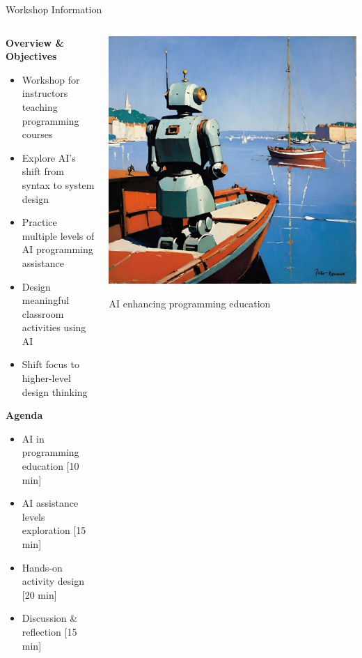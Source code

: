 \documentclass[xcolor={dvipsnames,table}, aspectratio=169]{beamer}
\begin{document}
\begin{frame}{Workshop Information}
  \begin{columns}
    \begin{column}{0.58\textwidth}
      \textbf{Overview \& Objectives}
      \begin{itemize}\small
        \item Workshop for instructors teaching programming courses
        \item Explore AI's shift from syntax to system design
        \item Practice multiple levels of AI programming assistance
        \item Design meaningful classroom activities using AI
        \item Shift focus to higher-level design thinking
      \end{itemize}
      
      \textbf{Agenda}
      \begin{itemize}\small
        \item AI in programming education [10 min]
        \item AI assistance levels exploration [15 min]
        \item Hands-on activity design [20 min]
        \item Discussion \& reflection [15 min]
      \end{itemize}
    \end{column}
    
    \begin{column}{0.38\textwidth}
      \includegraphics[width=\textwidth]{images/ai_programming.jpeg}
      \vspace{0.2cm}
      \small\centerline{AI enhancing programming education}
    \end{column}
  \end{columns}
\end{frame}
\end{document}
